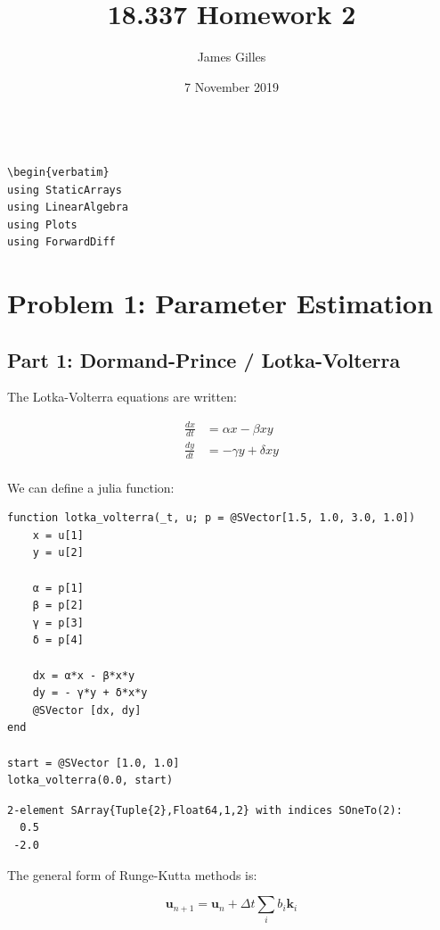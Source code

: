 \documentclass[nobib]{tufte-handout}
\author{James Gilles}
\date{7 November 2019}
\title{18.337 Homework 2}
\makeatletter
\renewcommand{\maketitle}{%
\begingroup
\setlength{\parindent}{0pt}%
\setlength{\parskip}{4pt}%
\LARGE\scshape\plaintitle\par
\Large\itshape\plainauthor\par
\Large\itshape\thedate\par
\endgroup
}
\newcommand{\uv}[0]{\mathbf{u}}
\newcommand{\kv}[0]{\mathbf{k}}
\makeatother
\begin{document}
\maketitle
\tableofcontents

\begin{verbatim}

\begin{verbatim}
using StaticArrays
using LinearAlgebra
using Plots
using ForwardDiff
\end{verbatim}

\section{Problem 1: Parameter Estimation}
\label{sec:org8faa15c}
\subsection{Part 1: Dormand-Prince / Lotka-Volterra}
\label{sec:orgccf8d63}
The Lotka-Volterra equations are written:

\begin{align}
\frac{dx}{dt} &= \alpha x - \beta x y\\
\frac{dy}{dt} &= - \gamma y + \delta x y\\
\end{align}

We can define a julia function:

\begin{verbatim}
function lotka_volterra(_t, u; p = @SVector[1.5, 1.0, 3.0, 1.0])
    x = u[1]
    y = u[2]

    α = p[1]
    β = p[2]
    γ = p[3]
    δ = p[4]

    dx = α*x - β*x*y
    dy = - γ*y + δ*x*y
    @SVector [dx, dy]
end

start = @SVector [1.0, 1.0]
lotka_volterra(0.0, start)
\end{verbatim}

\begin{verbatim}
2-element SArray{Tuple{2},Float64,1,2} with indices SOneTo(2):
  0.5
 -2.0
\end{verbatim}


The general form of Runge-Kutta methods is:

$$\uv_{n+1} = \uv_n + \Delta t \sum_{i} b_i \kv_i$$
\end{document}
